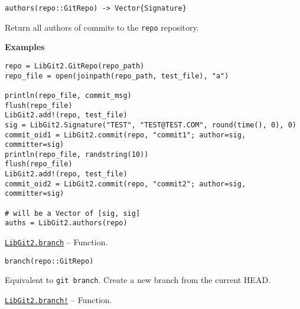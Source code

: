 \begin{adjustwidth}{2em}{0pt}


\begin{verbatim}
authors(repo::GitRepo) -> Vector{Signature}
\end{verbatim}

Return all authors of commits to the \texttt{repo} repository.

\textbf{Examples}


\begin{verbatim}
repo = LibGit2.GitRepo(repo_path)
repo_file = open(joinpath(repo_path, test_file), "a")

println(repo_file, commit_msg)
flush(repo_file)
LibGit2.add!(repo, test_file)
sig = LibGit2.Signature("TEST", "TEST@TEST.COM", round(time(), 0), 0)
commit_oid1 = LibGit2.commit(repo, "commit1"; author=sig, committer=sig)
println(repo_file, randstring(10))
flush(repo_file)
LibGit2.add!(repo, test_file)
commit_oid2 = LibGit2.commit(repo, "commit2"; author=sig, committer=sig)

# will be a Vector of [sig, sig]
auths = LibGit2.authors(repo)
\end{verbatim}



\end{adjustwidth}
\hypertarget{17976386758924249721}{} 
\hyperlink{17976386758924249721}{\texttt{LibGit2.branch}}  -- {Function.}

\begin{adjustwidth}{2em}{0pt}


\begin{verbatim}
branch(repo::GitRepo)
\end{verbatim}

Equivalent to \texttt{git branch}. Create a new branch from the current HEAD.



\end{adjustwidth}
\hypertarget{10282470573382896007}{} 
\hyperlink{10282470573382896007}{\texttt{LibGit2.branch!}}  -- {Function.}

